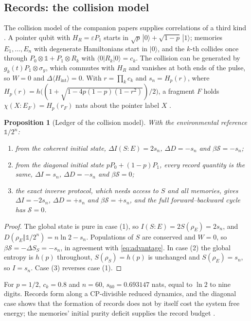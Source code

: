 \documentclass[12pt]{article}
\newtheorem{proposition}[theorem]{Proposition}
\begin{document}
\subsection{Records: the collision model}
\label{subsec:collision}

The collision model of the companion papers supplies correlations of a third kind \cite{Liu2026HAFF_E,Liu2026HAFF_F}. A pointer qubit with $H_R=\varepsilon P_1$ starts in $\sqrt p\,|0\rangle+\sqrt{1-p}\,|1\rangle$; memories $E_1,\dots,E_n$ with degenerate Hamiltonians start in $|0\rangle$, and the $k$-th collides once through $P_0\otimes\mathbb 1+P_1\otimes R_k$ with $\langle0|R_k|0\rangle=c_k$. The collision can be generated by $g_k(t)P_1\otimes\sigma_y$, which commutes with $H_R$ and vanishes at both ends of the pulse, so $W=0$ and $\Delta\langle H_{\mathrm{int}}\rangle=0$. With $r=\prod_kc_k$ and $s_n=H_p(r)$, where $H_p(r)=h\bigl((1+\sqrt{1-4p(1-p)(1-r^2)})/2\bigr)$, a fragment $F$ holds $\chi(X{:}E_F)=H_p(r_F)$ nats about the pointer label $X$ \cite{Liu2026HAFF_E}.

\begin{proposition}[Ledger of the collision model]
\label{prop:collision_ledger}
With the environmental reference $\mathbb 1/2^n$:
\begin{enumerate}
\item from the coherent initial state, $\Delta I(S{:}E)=2s_n$, $\Delta D=-s_n$ and $\beta\mathcal S=-s_n$;
\item from the diagonal initial state $pP_0+(1-p)P_1$, every record quantity is the same, $\Delta I=s_n$, $\Delta D=-s_n$ and $\beta\mathcal S=0$;
\item the exact inverse protocol, which needs access to $S$ and all memories, gives $\Delta I=-2s_n$, $\Delta D=+s_n$ and $\beta\mathcal S=+s_n$, and the full forward--backward cycle has $\mathcal S=0$.
\end{enumerate}
\end{proposition}

\begin{proof}
The global state is pure in case (1), so $I(S{:}E)=2S(\rho_E)=2s_n$, and $D(\rho_E\Vert\mathbb 1/2^n)=n\ln2-s_n$. Populations of $S$ are conserved and $W=0$, so $\beta\mathcal S=-\Delta S_S=-s_n$, in agreement with \eqref{eq:advantage}. In case (2) the global entropy is $h(p)$ throughout, $S(\rho_S)=h(p)$ is unchanged and $S(\rho_E)=s_n$, so $I=s_n$. Case (3) reverses case (1).
\end{proof}

For $p=1/2$, $c_k=0.8$ and $n=60$, $s_{60}=0.693147$ nats, equal to $\ln2$ to nine digits. Records form along a CP-divisible reduced dynamics, and the diagonal case shows that the formation of records does not by itself cost the system free energy; the memories' initial purity deficit supplies the record budget \cite{Liu2026HAFF_F}.
\end{document}
